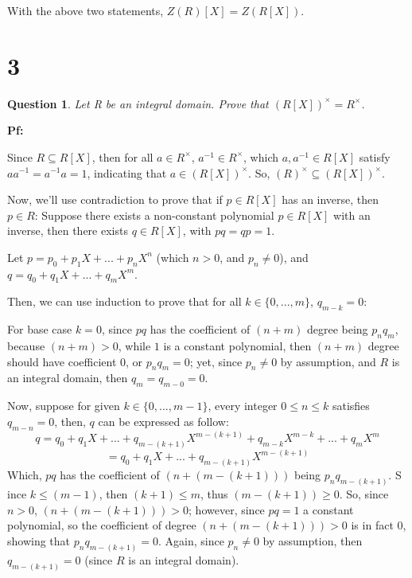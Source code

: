\documentclass{article}
\newtheorem{question}{Question}
\begin{document}
With the above two statements, $Z(R)[X]=Z(R[X])$.

\break


\section*{3}
\begin{myBox}[]{}
    \begin{question}
        Let R be an integral domain. Prove that $(R[X])^\times = R^\times$.
    \end{question}
\end{myBox}

\textbf{Pf:}

Since $R \subseteq R[X]$, then for all $a\in R^\times$, $a^{-1}\in R^\times$, which $a,a^{-1}\in R[X]$ satisfy $aa^{-1}=a^{-1}a=1$,
indicating that $a\in (R[X])^\times$. So, $(R)^\times \subseteq (R[X])^\times$.

\hfill

Now, we'll use contradiction to prove that if $p\in R[X]$ has an inverse, then $p\in R$:
Suppose there exists a non-constant polynomial $p\in R[X]$ with an inverse, then there exists $q\in R[X]$,
with $pq=qp = 1$.

Let $p=p_0+p_1X+...+p_nX^n$ (which $n>0$, and $p_n \neq 0$), and $q = q_0+q_1X+...+q_mX^m$.

Then, we can use induction to prove that for all $k\in \{0,...,m\}$, $q_{m-k}=0$:

\hfill

For base case $k=0$, since $pq$ has the coefficient of $(n+m)$ degree being $p_nq_m$, because $(n+m)>0$, while $1$ is a constant polynomial,
then $(n+m)$ degree should have coefficient $0$, or $p_nq_m=0$; yet, since $p_n\neq 0$ by assumption, and $R$ is an integral domain,
then $q_m = q_{m-0}=0$.

Now, suppose for given $k\in \{0,...,m-1\}$, every integer $0\leq n \leq k$ satisfies $q_{m-n}=0$, then, $q$ can be expressed as follow:
$$q = q_0 + q_1X +... + q_{m-(k+1)}X^{m-(k+1)} + q_{m-k}X^{m-k}+...+q_mX^m$$
$$=q_0 + q_1X +... + q_{m-(k+1)}X^{m-(k+1)}$$
Which, $pq$ has the coefficient of $(n+(m-(k+1)))$ being $p_nq_{m-(k+1)}$. S    ince $k\leq (m-1)$, then $(k+1)\leq m$, thus $(m-(k+1))\geq 0$.
So, since $n>0$, $(n+(m-(k+1)))>0$; however, since $pq=1$ a constant polynomial, so the coefficient of degree $(n+(m-(k+1)))>0$ is in fact $0$,
showing that $p_nq_{m-(k+1)}=0$. Again, since $p_n\neq 0$ by assumption, then $q_{m-(k+1)}=0$ (since $R$ is an integral domain).
\end{document}
